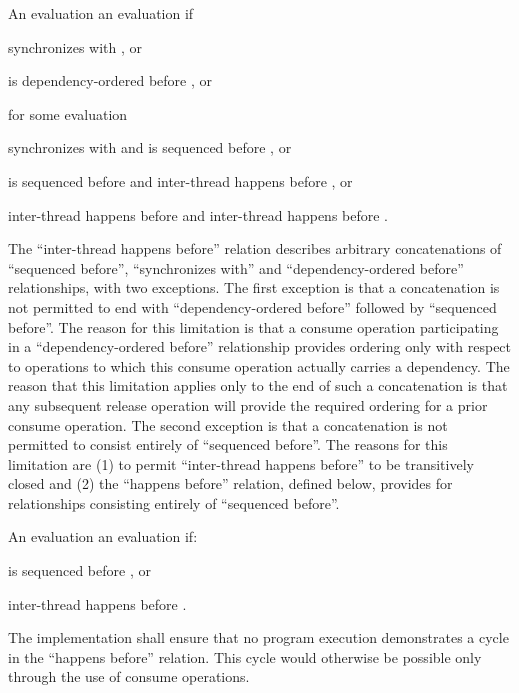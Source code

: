 \pnum
An evaluation   an evaluation 
if

\begin{compactitem}

\item
{} synchronizes with , or

\item
{} is dependency-ordered before , or

\item
for some evaluation 

\begin{compactitem}[$\bullet$]
\item
{} synchronizes with  and  is sequenced before ,
or

\item
{} is sequenced before  and  inter-thread happens before
, or

\item
{} inter-thread happens before  and  inter-thread happens
before .
\end{compactitem}
\end{compactitem}
%
\enternote The ``inter-thread happens before'' relation describes arbitrary
concatenations of ``sequenced before'', ``synchronizes with'' and
``dependency-ordered before'' relationships, with two exceptions. The first
exception is that a concatenation is not permitted to end with
``dependency-ordered before'' followed by ``sequenced before''. The reason for
this limitation is that a consume operation participating in a
``dependency-ordered before'' relationship provides ordering only with respect
to operations to which this consume operation actually carries a dependency. The
reason that this limitation applies only to the end of such a concatenation is
that any subsequent release operation will provide the required ordering for a
prior consume operation. The second exception is that a concatenation is not
permitted to consist entirely of ``sequenced before''. The reasons for this
limitation are (1) to permit ``inter-thread happens before'' to be transitively
closed and (2) the ``happens before'' relation, defined below, provides for
relationships consisting entirely of ``sequenced before''. \exitnote

\pnum
An evaluation   an evaluation  if:

\begin{compactitem}
\item {} is sequenced before , or
\item {} inter-thread happens before .
\end{compactitem}
%
The implementation shall ensure that no program execution demonstrates a cycle
in the ``happens before'' relation. \enternote This cycle would otherwise be
possible only through the use of consume operations. \exitnote

